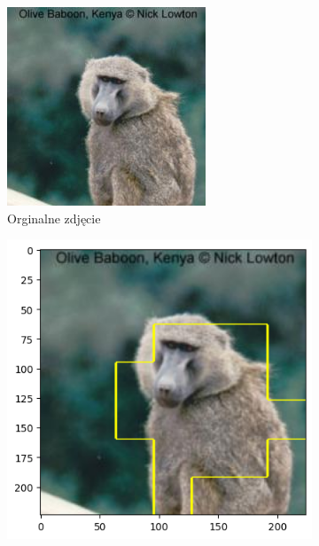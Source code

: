
\begin{figure}[h]
	\centering
	\begin{subfigure}[b]{0.3\textwidth}
		\includegraphics[width=.9\textwidth]{img/examples/appendix/n02486410_08484}
		\caption{Orginalne zdjęcie}  \label{}
	\end{subfigure}
	\begin{subfigure}[b]{0.3\textwidth}
		\centering\includegraphics[width=.9\textwidth]{img/examples/appendix/n02486410_08484_gradcam}

\end{subfigure}
\end{figure}
